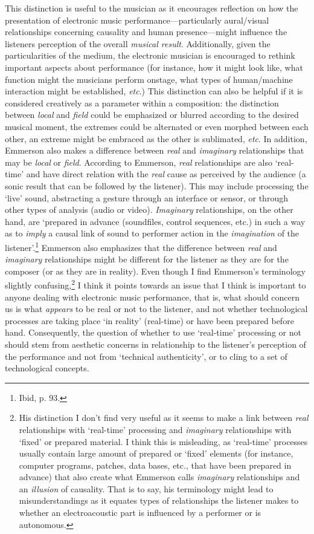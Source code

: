 This distinction is useful to the musician as it encourages reflection on how the presentation of electronic music performance---particularly aural/visual relationships concerning causality and human presence---might influence the listeners perception of the overall \emph{musical result}. Additionally, given the particularities of the medium, the electronic musician is encouraged to rethink important aspects about performance (for instance, how it might look like, what function might the musicians perform onstage, what types of human/machine interaction might be established, \emph{etc}.) This distinction can also be helpful if it is considered creatively as a parameter within a composition: the distinction between \emph{local} and \emph{field} could be emphasized or blurred according to the desired musical moment, the extremes could be alternated or even morphed between each other, an extreme might be embraced as the other is sublimated, \emph{etc}. In addition, Emmerson also makes a difference between \emph{real} and \emph{imaginary} relationships that may be \emph{local} or \emph{field}. According to Emmerson, \emph{real} relationships are also `real-time' and have direct relation with the \emph{real} cause as perceived by the audience (a sonic result that can be followed by the listener). This may include processing the `live' sound, abstracting a gesture through an interface or sensor, or through other types of analysis (audio or video). \emph{Imaginary} relationships, on the other hand, are `prepared in advance (soundfiles, control sequences, etc.) in such a way as to \emph{imply} a causal link of sound to performer action in the \emph{imagination} of the listener'.\footnote{Ibid, p. 93.} Emmerson also emphasizes that the difference between \emph{real} and \emph{imaginary} relationships might be different for the listener as they are for the composer (or as they are in reality). Even though I find Emmerson's terminology slightly confusing,\footnote{His distinction I don't find very useful as it seems to make a link between \emph{real} relationships with `real-time' processing and \emph{imaginary} relationships with `fixed' or prepared material. I think this is misleading, as `real-time' processes usually contain large amount of prepared or `fixed' elements (for instance, computer programs, patches, data bases, etc., that have been prepared in advance) that also create what Emmerson calls \emph{imaginary} relationships and an \emph{illusion} of causality. That is to say, his terminology might lead to misunderstandings as it equates types of relationships the listener makes to whether an electroacoustic part is influenced by a performer or is autonomous.} I think it points towards an issue that I think is important to anyone dealing with electronic music performance, that is, what should concern us is what \emph{appears} to be real or not to the listener, and not whether technological processes are taking place `in reality' (real-time) or have been prepared before hand. Consequently, the question of whether to use `real-time' processing or not should stem from aesthetic concerns in relationship to the listener's perception of the performance and not from `technical authenticity', or to cling to a set of technological concepts.

